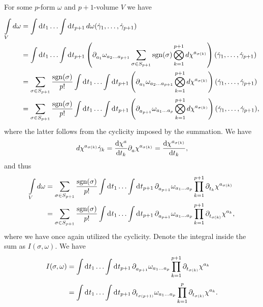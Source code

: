 For some $p$-form $\omega$ and $p + 1$-volume $V$ we have
\begin{align*}
	\minteg{V}{d\omega} &= \integ{}{}{t_{1}}{\dots \integ{}{}{t_{p + 1}}{d\omega(\dot{\gamma}_{1},\dots, \dot{\gamma}_{p + 1})}} \\
	                    &= \integ{}{}{t_{1}}{\dots \integ{}{}{t_{p + 1}}{\left(\del{a_{1}}{\omega_{a_{2}\dots a_{p + 1}}}\sum\limits_{\sigma\in S_{p + 1}}\text{sgn}(\sigma)\bigotimes_{k = 1}^{p + 1}d\chi^{a_{\sigma(k)}}\right)(\dot{\gamma}_{1},\dots, \dot{\gamma}_{p + 1})}} \\
	                    &= \sum\limits_{\sigma\in S_{p + 1}}\frac{\text{sgn}(\sigma)}{p!}\integ{}{}{t_{1}}{\dots \integ{}{}{t_{p + 1}}{\left(\del{a_{1}}{\omega_{a_{2}\dots a_{p + 1}}}\bigotimes_{k = 1}^{p + 1}d\chi^{a_{\sigma(k)}}\right)(\dot{\gamma}_{1},\dots, \dot{\gamma}_{p + 1})}} \\
	                    &= \sum\limits_{\sigma\in S_{p + 1}}\frac{\text{sgn}(\sigma)}{p!}\integ{}{}{t_{1}}{\dots \integ{}{}{t_{p + 1}}{\left(\del{a_{p + 1}}{\omega_{a_{1}\dots a_{p}}}\bigotimes_{k = 1}^{p + 1}d\chi^{a_{\sigma(k)}}\right)(\dot{\gamma}_{1},\dots, \dot{\gamma}_{p + 1})}},
\end{align*}
where the latter follows from the cyclicity imposed by the summation. We have
\begin{align*}
	d\chi^{a_{\sigma(k)}}{\dot{\gamma}_{k}} = \dv{\chi^{a}}{t_{k}}\partial^{}_{a}\chi^{a_{\sigma(k)}} = \dv{\chi^{a_{\sigma(k)}}}{t_{k}},
\end{align*}
and thus
\begin{align*}
	\minteg{V}{d\omega} &= \sum\limits_{\sigma\in S_{p + 1}}\frac{\text{sgn}(\sigma)}{p!}\integ{}{}{t_{1}}{\dots \integ{}{}{t_{p + 1}}{\del{a_{p + 1}}{\omega_{a_{1}\dots a_{p}}}\prod\limits_{k = 1}^{p + 1}\del{t_{k}}{\chi^{a_{\sigma(k)}}}}} \\
	                    &= \sum\limits_{\sigma\in S_{p + 1}}\frac{\text{sgn}(\sigma)}{p!}\integ{}{}{t_{1}}{\dots \integ{}{}{t_{p + 1}}{\del{a_{p + 1}}{\omega_{a_{1}\dots a_{p}}}\prod\limits_{k = 1}^{p + 1}\del{t_{\sigma(k)}}{\chi^{a_{k}}}}},
\end{align*}
where we have once again utilized the cyclicity. Denote the integral inside the sum as $I(\sigma, \omega)$. We have
\begin{align*}
	I(\sigma, \omega) &= \integ{}{}{t_{1}}{\dots \integ{}{}{t_{p + 1}}{\del{a_{p + 1}}{\omega_{a_{1}\dots a_{p}}}\prod\limits_{k = 1}^{p + 1}\del{t_{\sigma(k)}}{\chi^{a_{k}}}}} \\
	                  &= \integ{}{}{t_{1}}{\dots \integ{}{}{t_{p + 1}}{\del{t_{\sigma(p + 1)}}{\omega_{a_{1}\dots a_{p}}}\prod\limits_{k = 1}^{p}\del{t_{\sigma(k)}}{\chi^{a_{k}}}}}.
\end{align*}
